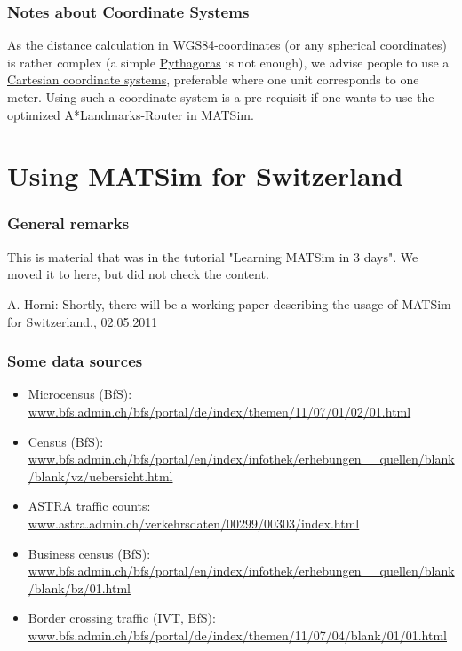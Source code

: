 \subsubsection{Notes about Coordinate Systems}

As the distance calculation in WGS84-coordinates (or any spherical coordinates) is rather complex (a simple \href{http://en.wikipedia.org/wiki/Pythagorean_theorem}{Pythagoras} is not enough), we advise people to use a \href{http://en.wikipedia.org/wiki/Coordinate_system}{Cartesian coordinate systems},  preferable where one unit corresponds to one meter. Using such a  coordinate system is a pre-requisit if one wants to use the optimized  A*Landmarks-Router in MATSim.

\vfill\eject
\section{Using MATSim for Switzerland}

\subsubsection{General remarks}

This is material that was in the tutorial "Learning MATSim in 3 days". We moved it to here, but did not check the content.

A. Horni: Shortly, there will be a working paper describing the usage of MATSim for Switzerland., 02.05.2011

\subsubsection{Some data sources}
\begin{itemize}
	\item Microcensus (BfS): \href{http://www.bfs.admin.ch/bfs/portal/de/index/themen/11/07/01/02/01.html}{www.bfs.admin.ch/bfs/portal/de/index/themen/11/07/01/02/01.html}
	\item Census (BfS): \href{http://www.bfs.admin.ch/bfs/portal/en/index/infothek/erhebungen__quellen/blank/blank/vz/uebersicht.html}{www.bfs.admin.ch/bfs/portal/en/index/infothek/erhebungen\_\_quellen/blank/blank/vz/uebersicht.html}
	\item ASTRA traffic counts: \href{http://www.astra.admin.ch/verkehrsdaten/00299/00303/index.html?lang=en}{www.astra.admin.ch/verkehrsdaten/00299/00303/index.html}
	\item Business census (BfS): \href{http://www.bfs.admin.ch/bfs/portal/en/index/infothek/erhebungen__quellen/blank/blank/bz/01.html}{www.bfs.admin.ch/bfs/portal/en/index/infothek/erhebungen\_\_quellen/blank/blank/bz/01.html}
	\item Border crossing traffic (IVT, BfS): \href{http://www.bfs.admin.ch/bfs/portal/de/index/themen/11/07/04/blank/01/01.html}{www.bfs.admin.ch/bfs/portal/de/index/themen/11/07/04/blank/01/01.html}
\end{itemize}


